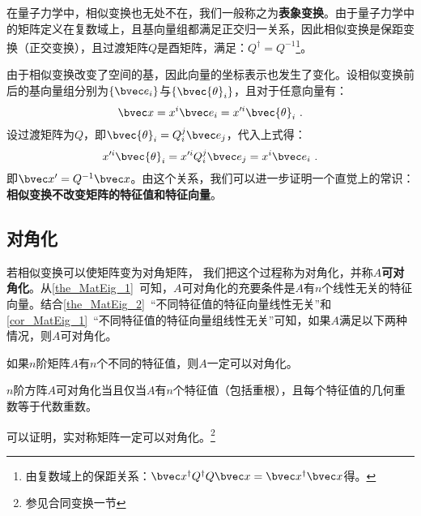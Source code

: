 在量子力学中，相似变换也无处不在，我们一般称之为\textbf{表象变换}。由于量子力学中的矩阵定义在复数域上，且基向量组都满足正交归一关系，因此相似变换是保距变换（正交变换），且过渡矩阵$Q$是酉矩阵，满足：$Q^{\dagger}=Q^{-1}$\footnote{由复数域上的保距关系：$\bvec x^{\dagger}Q^{\dagger}Q\bvec x=\bvec x^{\dagger}\bvec x$得。}。

由于相似变换改变了空间的基，因此向量的坐标表示也发生了变化。设相似变换前后的基向量组分别为$\{\bvec e_i\}$与$\{\bvec {\theta}_i\}$，且对于任意向量有：
\begin{equation}
\bvec x=x^i\bvec e_i=x'^i\bvec {\theta}_i~.
\end{equation}
设过渡矩阵为$Q$，即$\bvec{\theta}_i=Q^j_i\bvec e_j$，代入上式得：
\begin{equation}
x'^i\bvec {\theta}_i=x'^iQ^j_i\bvec e_j=x^i\bvec e_i~.
\end{equation}
即$\bvec x'=Q^{-1}\bvec x$。由这个关系，我们可以进一步证明一个直觉上的常识：\textbf{相似变换不改变矩阵的特征值和特征向量}。
\subsection{对角化}

若相似变换可以使矩阵变为对角矩阵， 我们把这个过程称为对角化，并称$A$\textbf{可对角化}。从\autoref{the_MatEig_1}~可知，$A$可对角化的充要条件是$A$有$n$个线性无关的特征向量。结合\autoref{the_MatEig_2}~“不同特征值的特征向量线性无关”和\autoref{cor_MatEig_1}~“不同特征值的特征向量组线性无关”可知，如果$A$满足以下两种情况，则$A$可对角化。
\begin{corollary}{}
如果$n$阶矩阵$A$有$n$个不同的特征值，则$A$一定可以对角化。
\end{corollary}
\begin{corollary}{}
$n$阶方阵$A$可对角化当且仅当$A$有$n$个特征值（包括重根），且每个特征值的几何重数等于代数重数。
\end{corollary}



可以证明，实对称矩阵一定可以对角化。\footnote{参见合同变换一节}

